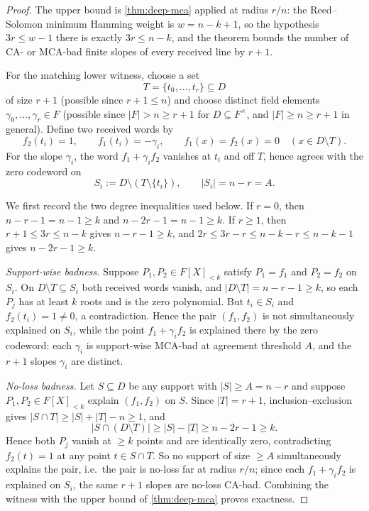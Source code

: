 \documentclass[11pt]{article}
\theoremstyle{definition}
\theoremstyle{remark}
\begin{document}
\begin{proof}
The upper bound is \cref{thm:deep-mca} applied at radius $r/n$: the Reed--Solomon minimum Hamming weight is $w=n-k+1$, so the hypothesis $3r\le w-1$ there is exactly $3r\le n-k$, and the theorem bounds the number of CA- or MCA-bad finite slopes of every received line by $r+1$.

For the matching lower witness, choose a set
\[
        T=\{t_0,\ldots,t_r\}\subseteq D
\]
of size $r+1$ \textup{(possible since $r+1\le n$)} and choose distinct field elements $\gamma_0,\ldots,\gamma_r\in F$ \textup{(possible since $|F|>n\ge r+1$ for $D\subseteq F^\times$, and $|F|\ge n\ge r+1$ in general)}.  Define two received words by
\[
        f_2(t_i)=1,
        \qquad
        f_1(t_i)=-\gamma_i,
        \qquad
        f_1(x)=f_2(x)=0\quad (x\in D\setminus T).
\]
For the slope $\gamma_i$, the word $f_1+\gamma_i f_2$ vanishes at $t_i$ and off $T$, hence agrees with the zero codeword on
\[
        S_i:=D\setminus (T\setminus\{t_i\}),
        \qquad |S_i|=n-r=A .
\]

We first record the two degree inequalities used below.  If $r=0$, then $n-r-1=n-1\ge k$ and $n-2r-1=n-1\ge k$.  If $r\ge1$, then $r+1\le 3r\le n-k$ gives $n-r-1\ge k$, and $2r\le 3r-r\le n-k-r\le n-k-1$ gives $n-2r-1\ge k$.

\emph{Support-wise badness.}  Suppose $P_1,P_2\in F[X]_{<k}$ satisfy $P_1=f_1$ and $P_2=f_2$ on $S_i$.  On $D\setminus T\subseteq S_i$ both received words vanish, and $|D\setminus T|=n-r-1\ge k$, so each $P_j$ has at least $k$ roots and is the zero polynomial.  But $t_i\in S_i$ and $f_2(t_i)=1\ne0$, a contradiction.  Hence the pair $(f_1,f_2)$ is not simultaneously explained on $S_i$, while the point $f_1+\gamma_i f_2$ is explained there by the zero codeword: each $\gamma_i$ is support-wise MCA-bad at agreement threshold $A$, and the $r+1$ slopes $\gamma_i$ are distinct.

\emph{No-loss badness.}  Let $S\subseteq D$ be any support with $|S|\ge A=n-r$ and suppose $P_1,P_2\in F[X]_{<k}$ explain $(f_1,f_2)$ on $S$.  Since $|T|=r+1$, inclusion--exclusion gives $|S\cap T|\ge|S|+|T|-n\ge1$, and
\[
        |S\cap(D\setminus T)|\ge |S|-|T|\ge n-2r-1\ge k .
\]
Hence both $P_j$ vanish at $\ge k$ points and are identically zero, contradicting $f_2(t)=1$ at any point $t\in S\cap T$.  So no support of size $\ge A$ simultaneously explains the pair, i.e.\ the pair is no-loss far at radius $r/n$; since each $f_1+\gamma_if_2$ is explained on $S_i$, the same $r+1$ slopes are no-loss CA-bad.  Combining the witness with the upper bound of \cref{thm:deep-mca} proves exactness.
\end{proof}
\end{document}
